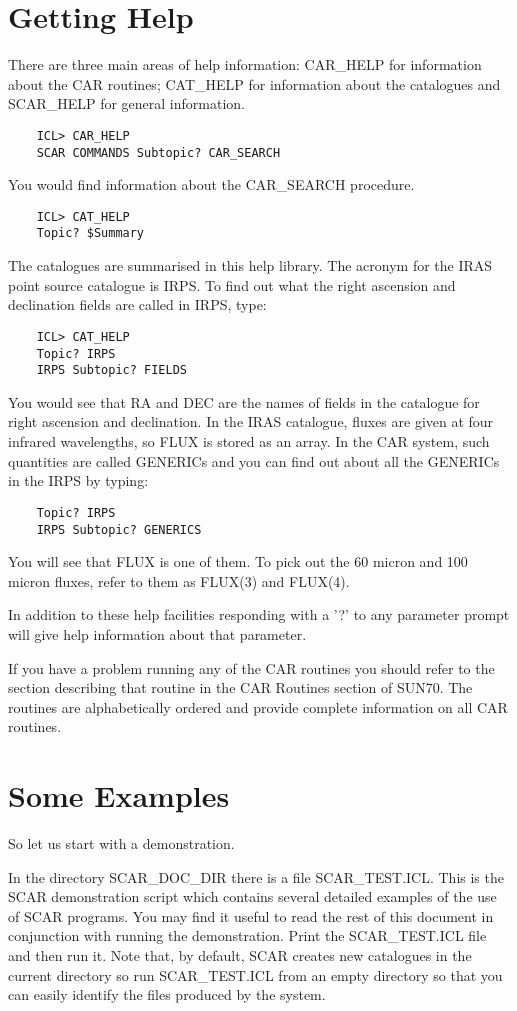 \section {Getting Help}
There are three main areas of help information: CAR\_HELP for information
about the CAR routines; CAT\_HELP for information about the catalogues and
SCAR\_HELP for general information.
\begin{verbatim}
    ICL> CAR_HELP
    SCAR COMMANDS Subtopic? CAR_SEARCH
\end{verbatim}
You would find information about the CAR\_SEARCH procedure.
\begin{verbatim}
    ICL> CAT_HELP
    Topic? $Summary
\end{verbatim}
The catalogues are summarised in this help library.
The acronym for the IRAS point source catalogue is IRPS.
To find out what the right ascension and declination fields are called in IRPS,
type:
\begin{verbatim}
    ICL> CAT_HELP
    Topic? IRPS
    IRPS Subtopic? FIELDS
\end{verbatim}
You would see that RA and DEC are the names of fields in the catalogue for right
ascension and declination.
In the IRAS catalogue, fluxes are given at four infrared wavelengths, so FLUX is
stored as an array.
In the CAR system, such quantities are called GENERICs and you can find out
about all the GENERICs in the IRPS by typing:
\begin{verbatim}
    Topic? IRPS
    IRPS Subtopic? GENERICS
\end{verbatim}
You will see that FLUX is one of them.
To pick out the 60 micron and 100 micron fluxes, refer to them as FLUX(3) and
FLUX(4).

In addition to these help facilities responding with a '?' to any parameter
prompt will give help information about that parameter.

If you have a problem running any of the CAR routines you should refer to the
section describing that routine in the CAR Routines section of SUN70. The
routines are alphabetically ordered and provide complete information on all
CAR routines.

\section {Some Examples}

So let us start with a demonstration.

In the directory SCAR\_DOC\_DIR there is a file SCAR\_TEST.ICL.
This is the SCAR demonstration script which contains several detailed
examples of the use of SCAR programs. You may find it useful to read the
rest of this document in conjunction with running the demonstration.
Print the SCAR\_TEST.ICL file and then run it.
Note that, by default, SCAR creates new catalogues in the current directory so
run SCAR\_TEST.ICL from an empty directory so that you can easily identify the
files produced by the system.

